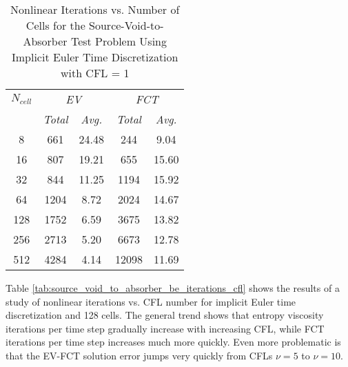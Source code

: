 \begin{table}[ht]
\caption{Nonlinear Iterations vs. Number of Cells for the
  Source-Void-to-Absorber Test Problem Using Implicit Euler Time Discretization
  with CFL = 1}
\label{tab:source_void_to_absorber_be_iterations_cells}
\centering
\begin{tabular}{c c c c c}\toprule
$N_{cell}$ & \multicolumn{2}{c}{\emph{EV}} & \multicolumn{2}{c}{\emph{FCT}}\\
           & \emph{Total} & \emph{Avg.}    &  \emph{Total} & \emph{Avg.}\\\midrule
  8 &  661 & 24.48 &   244 &  9.04\\
 16 &  807 & 19.21 &   655 & 15.60\\
 32 &  844 & 11.25 &  1194 & 15.92\\
 64 & 1204 &  8.72 &  2024 & 14.67\\
128 & 1752 &  6.59 &  3675 & 13.82\\
256 & 2713 &  5.20 &  6673 & 12.78\\
512 & 4284 &  4.14 & 12098 & 11.69\\
\bottomrule\end{tabular}
\end{table}

Table \ref{tab:source_void_to_absorber_be_iterations_cfl} shows
the results of a study of nonlinear iterations vs. CFL number for
implicit Euler time discretization and 128 cells. The general
trend shows that entropy viscosity iterations per time step gradually increase
with increasing CFL, while FCT iterations per time step increases
much more quickly. Even more problematic is that the EV-FCT solution
error jumps very quickly from CFLs $\nu=5$ to $\nu=10$.

